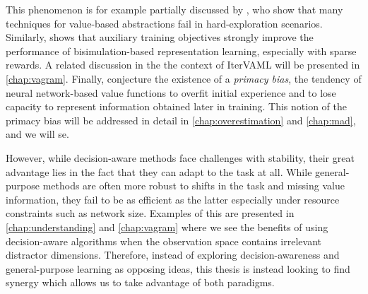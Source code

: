 This phenomenon is for example partially discussed by \textcite{tomar2023learning}, who show that many techniques for value-based abstractions fail in hard-exploration scenarios.
Similarly, \textcite{kemertas2021towards} shows that auxiliary training objectives strongly improve the performance of bisimulation-based representation learning, especially with sparse rewards.
A related discussion in the the context of IterVAML will be presented in \autoref{chap:vagram}.
Finally, \textcite{nikishin2022primacy} conjecture the existence of a \emph{primacy bias}, the tendency of neural network-based value functions to overfit initial experience and to lose capacity to represent information obtained later in training.
This notion of the primacy bias will be addressed in detail in \autoref{chap:overestimation} and \autoref{chap:mad}, and we will se.

However, while decision-aware methods face challenges with stability, their great advantage lies in the fact that they can adapt to the task at all.
While general-purpose methods are often more robust to shifts in the task and missing value information, they fail to be as efficient as the latter especially under resource constraints such as network size.
Examples of this are presented in \autoref{chap:understanding} and \autoref{chap:vagram} where we see the benefits of using decision-aware algorithms when the observation space contains irrelevant distractor dimensions.
Therefore, instead of exploring decision-awareness and general-purpose learning as opposing ideas, this thesis is instead looking to find synergy which allows us to take advantage of both paradigms.
